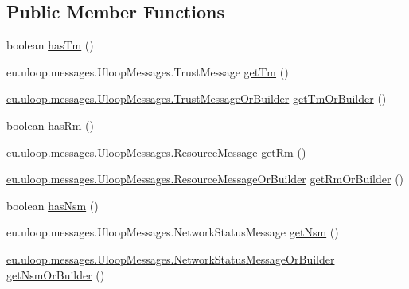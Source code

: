 \subsection*{Public Member Functions}
\begin{DoxyCompactItemize}
\item 
boolean \hyperlink{interfaceeu_1_1uloop_1_1messages_1_1UloopMessages_1_1UloopMessageOrBuilder_a15bc6942f889d7543772724e1ba252b9}{has\+Tm} ()
\item 
eu.\+uloop.\+messages.\+Uloop\+Messages.\+Trust\+Message \hyperlink{interfaceeu_1_1uloop_1_1messages_1_1UloopMessages_1_1UloopMessageOrBuilder_a5f9e7de3e0cc0ccefce160b62617083c}{get\+Tm} ()
\item 
\hyperlink{interfaceeu_1_1uloop_1_1messages_1_1UloopMessages_1_1TrustMessageOrBuilder}{eu.\+uloop.\+messages.\+Uloop\+Messages.\+Trust\+Message\+Or\+Builder} \hyperlink{interfaceeu_1_1uloop_1_1messages_1_1UloopMessages_1_1UloopMessageOrBuilder_a89debc14c7c00e06032231ddf0b50f28}{get\+Tm\+Or\+Builder} ()
\item 
boolean \hyperlink{interfaceeu_1_1uloop_1_1messages_1_1UloopMessages_1_1UloopMessageOrBuilder_ac122222acf94b2f06f9b4398f8278235}{has\+Rm} ()
\item 
eu.\+uloop.\+messages.\+Uloop\+Messages.\+Resource\+Message \hyperlink{interfaceeu_1_1uloop_1_1messages_1_1UloopMessages_1_1UloopMessageOrBuilder_a802371fb439d609f1e62a8b05205fdff}{get\+Rm} ()
\item 
\hyperlink{interfaceeu_1_1uloop_1_1messages_1_1UloopMessages_1_1ResourceMessageOrBuilder}{eu.\+uloop.\+messages.\+Uloop\+Messages.\+Resource\+Message\+Or\+Builder} \hyperlink{interfaceeu_1_1uloop_1_1messages_1_1UloopMessages_1_1UloopMessageOrBuilder_a2e24f0e2fed84a8a367884af83898b2e}{get\+Rm\+Or\+Builder} ()
\item 
boolean \hyperlink{interfaceeu_1_1uloop_1_1messages_1_1UloopMessages_1_1UloopMessageOrBuilder_af639135351f0506feafaeec8790b1cf5}{has\+Nsm} ()
\item 
eu.\+uloop.\+messages.\+Uloop\+Messages.\+Network\+Status\+Message \hyperlink{interfaceeu_1_1uloop_1_1messages_1_1UloopMessages_1_1UloopMessageOrBuilder_a143ae0fd01a45c24c31094abf9b89ccc}{get\+Nsm} ()
\item 
\hyperlink{interfaceeu_1_1uloop_1_1messages_1_1UloopMessages_1_1NetworkStatusMessageOrBuilder}{eu.\+uloop.\+messages.\+Uloop\+Messages.\+Network\+Status\+Message\+Or\+Builder} \hyperlink{interfaceeu_1_1uloop_1_1messages_1_1UloopMessages_1_1UloopMessageOrBuilder_a806ba3ee27017599e08eae34c7f59f59}{get\+Nsm\+Or\+Builder} ()

\end{DoxyCompactItemize}
